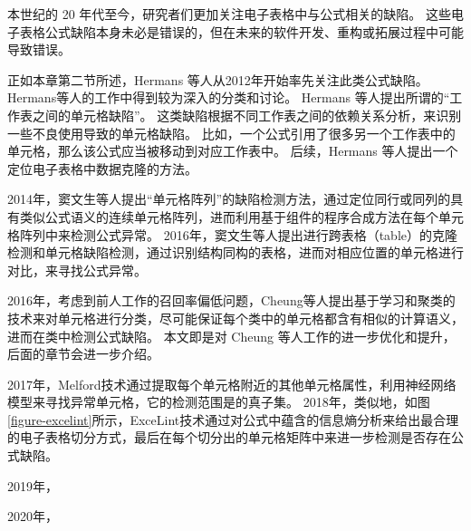 本世纪的 20 年代至今，研究者们更加关注电子表格中与公式相关的缺陷。
这些电子表格公式缺陷本身未必是错误的，但在未来的软件开发、重构或拓展过程中可能导致错误。

正如本章第二节所述，Hermans 等人\cite{hermans2012detecting,hermans2012detecting2,hermans2013data}从2012年开始率先关注此类公式缺陷。
Hermans等人\cite{hermans2012detecting2}的工作中得到较为深入的分类和讨论。
Hermans 等人\cite{hermans2012detecting}提出所谓的“工作表之间的单元格缺陷”。
这类缺陷根据不同工作表之间的依赖关系分析，来识别一些不良使用导致的单元格缺陷。
比如，一个公式引用了很多另一个工作表中的单元格，那么该公式应当被移动到对应工作表中。
后续，Hermans 等人\cite{hermans2013data}提出一个定位电子表格中数据克隆的方法。

2014年，窦文生等人\cite{dou2014spreadsheet,dou2017cacheck}提出“单元格阵列”的缺陷检测方法，通过定位同行或同列的具有类似公式语义的连续单元格阵列，进而利用基于组件的程序合成方法在每个单元格阵列中来检测公式异常。
2016年，窦文生等人\cite{dou2016detecting}提出进行跨表格（table）的克隆检测和单元格缺陷检测，通过识别结构同构的表格，进而对相应位置的单元格进行对比，来寻找公式异常。


2016年，考虑到前人工作的召回率偏低问题，Cheung等人\cite{cheung2016custodes}提出基于学习和聚类的技术来对单元格进行分类，尽可能保证每个类中的单元格都含有相似的计算语义，进而在类中检测公式缺陷。
本文即是对 Cheung 等人工作的进一步优化和提升，后面的章节会进一步介绍。

2017年，Melford\cite{singh2017melford}技术通过提取每个单元格附近的其他单元格属性，利用神经网络模型来寻找异常单元格，它的检测范围是\cu \cite{cheung2016custodes}的真子集。
2018年，类似地，如图\ref{figure-excelint}所示，ExceLint\cite{Barowy2018excelint}技术通过对公式中蕴含的信息熵分析来给出最合理的电子表格切分方式，最后在每个切分出的单元格矩阵中来进一步检测是否存在公式缺陷。

2019年，

2020年，






